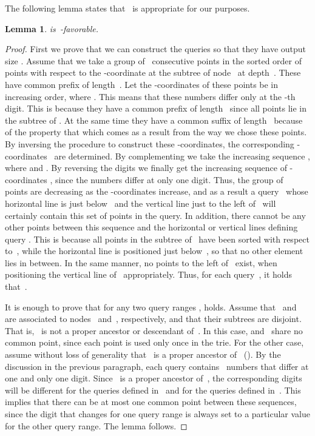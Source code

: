 \documentclass[]{article}
\newtheorem{lemma}{Lemma}[section]
\begin{document}
The following lemma states that~ is appropriate for our purposes.
\begin{lemma} \label{lem:query}
   is~-favorable. 
\end{lemma}
\begin{proof}
  First we prove that we can construct the queries so that they have output size
  . Assume that we take a group of~ consecutive
  points in the sorted order of points with respect to the -coordinate at the
  subtree of node~ at depth~. These have common prefix of length~. Let
  the -coordinates of these points be
   in
  increasing order, where . This means that these numbers
  differ only at the -th digit. This is because they have a
  common prefix of length~ since all points lie in the subtree of . At the
  same time they have a common suffix of length~ because of the
  property that  which comes as a result from the way
  we chose these points. By inversing the procedure to construct these
  -coordinates, the corresponding -coordinates~
  are determined. By complementing we take the increasing sequence
  ,
  where  and
  . By reversing the digits we finally
  get the increasing sequence of -coordinates ,
  since the numbers differ at only one digit. Thus, the group of~ points
  are decreasing as the -coordinates increase, and as a result a query~
  whose horizontal line is just below~ and the vertical line
  just to the left of~ will certainly contain this
  set of points in the query. In addition, there cannot be any other points
  between this sequence and the horizontal or vertical lines defining query .
  This is because all points in the subtree of~ have been sorted with respect
  to~, while the horizontal line is positioned just
  below~, so that no other element lies in between. In the
  same manner, no points to the left of~ exist, when
  positioning the vertical line of~ appropriately. Thus, for each query~, it holds that~.

  It is enough to prove that for any two query ranges ,  holds. Assume that~ and~ are associated to
  nodes~ and~, respectively, and that their subtrees are disjoint. That
  is,~ is not a proper ancestor or descendant of~. In this case, 
  and~ share no common point, since each point is used only once in the trie.
  For the other case, assume without loss of generality that~ is a proper
  ancestor of~ (). By the discussion in the previous paragraph,
  each query contains~ numbers that differ at one and only one digit.
  Since~ is a proper ancestor of~, the corresponding digits will be
  different for the queries defined in~ and for the queries defined in~.
  This implies that there can be at most one common point between these
  sequences, since the digit that changes for one query range is always set to a
  particular value for the other query range. The lemma follows.
\end{proof}
\end{document}
